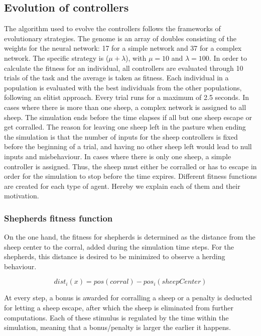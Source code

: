 \documentclass[conference]{IEEEtran}
\begin{document}
\subsection{Evolution of controllers}
\label{sec:controllers_evolution}
The algorithm used to evolve the controllers follows the frameworks of evolutionary strategies. 
The genome is an array of doubles consisting of the weights for the neural network: 17 for a simple network and 37 for a complex network. The specific strategy is ($\mu + \lambda$), with $\mu = 10$ and $\lambda = 100$. 
In order to calculate the fitness for an individual, all controllers are evaluated through 10 trials of the task and the average is taken as fitness.
Each individual in a population is evaluated with the best individuals from the other populations, following an elitist approach.
Every trial runs for a maximum of 2.5 seconds. 
In cases where there is more than one sheep, a complex network is assigned to all sheep. 
The simulation ends before the time elapses if all but one sheep escape or get corralled. 
The reason for leaving one sheep left in the pasture when ending the simulation is that the number of inputs for the sheep controllers is fixed before the beginning of a trial, and having no other sheep left would lead to null inputs and misbehaviour. 
In cases where there is only one sheep, a simple controller is assigned. 
Thus, the sheep must either be corralled or has to escape in order for the simulation to stop before the time expires.
Different fitness functions are created for each type of agent. 
Hereby we explain each of them and their motivation.
\vspace{1em}
\subsubsection{Shepherds fitness function}
On the one hand, the fitness for shepherds is determined as the distance from the sheep center to the corral, added during the simulation time steps. For the shepherds, this distance is desired to be minimized to observe a herding behaviour.  

$$ dist_i(x) = pos(corral) - pos_i(sheepCenter) $$

At every step, a bonus  is awarded for corralling a sheep or a penalty is deducted for letting a sheep escape, after which the sheep is eliminated from further computations. Each of these stimulus is regulated by the time within the simulation, meaning that a bonus/penalty is larger the earlier it happens. 
\end{document}
